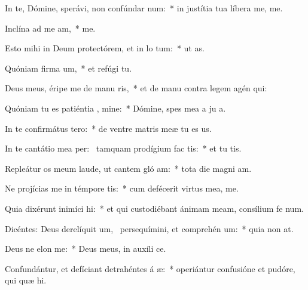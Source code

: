 \item In te, Dómine, sperávi, non confúndar  num:~* in justítia tua líbera me,   me.
\item Inclína ad me  am,~*   me.
\item Esto mihi in Deum protectórem, et in lo tum:~* ut   as.
\item Quóniam firma um,~* et refúgi   tu.
\item Deus meus, éripe me de manu ris,~* et de manu contra legem agén  qui:
\item Quóniam tu es patiéntia , mine:~* Dómine, spes mea a ju a.
\item In te confirmátus   tero:~* de ventre matris meæ tu es  us.
\item In te cantátio mea per:~\pscross{} tamquam prodígium fac  tis:~* et tu  tis.
\item Repleátur os meum laude, ut cantem gló am:~* tota die magni am.
\item Ne projícias me in témpore tis:~* cum defécerit virtus mea,   me.
\item Quia dixérunt inimíci  hi:~* et qui custodiébant ánimam meam, consílium fe  num.
\item Dicéntes: Deus derelíquit um,~\pscross{} persequímini, et comprehén um:~* quia non   at.
\item Deus ne elon  me:~* Deus meus, in auxíli  ce.
\item Confundántur, et defíciant detrahéntes á æ:~* operiántur confusióne et pudóre, qui quæ  hi.
